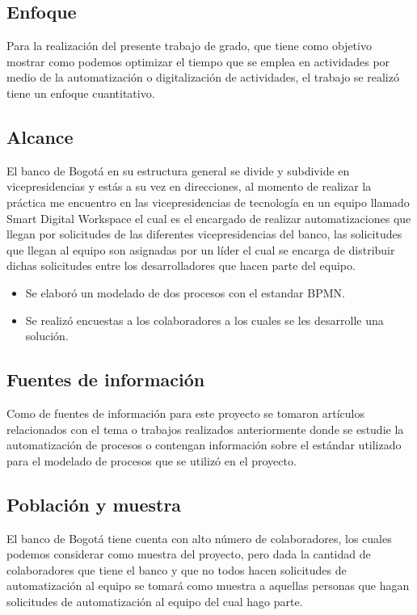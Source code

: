 \subsection[Enfoque]{Enfoque}
Para la realización del presente trabajo de grado, que tiene como objetivo mostrar como podemos optimizar el tiempo que se emplea en actividades por medio de la automatización  o digitalización de actividades, el trabajo se realizó tiene un enfoque cuantitativo.

\subsection[Alcance]{Alcance}
El banco de Bogotá en su estructura general se divide y subdivide en vicepresidencias y estás a su vez en direcciones, al momento de realizar la práctica me encuentro en las vicepresidencias de tecnología en un equipo llamado Smart Digital Workspace el cual es el encargado de realizar automatizaciones que llegan por solicitudes de las diferentes vicepresidencias del banco, las solicitudes que llegan al equipo son asignadas por un líder el cual se encarga de distribuir dichas solicitudes entre los desarrolladores que hacen parte del equipo.

\begin{itemize}
	\item Se elaboró un modelado de dos procesos con el estandar BPMN.
	\item Se realizó encuestas a los colaboradores a los cuales se les desarrolle una solución.
\end{itemize}


\subsection{Fuentes de información}
Como de fuentes de información para este proyecto se tomaron artículos relacionados con el tema o trabajos realizados anteriormente donde se estudie la automatización de procesos o contengan información sobre el estándar utilizado para el modelado de procesos que se utilizó en el proyecto.

\subsection[Población y muestra]{Población y muestra}

El banco de Bogotá tiene cuenta con alto número de colaboradores, los cuales podemos considerar como muestra del proyecto, pero dada la cantidad de colaboradores que tiene el banco y que no todos hacen solicitudes de automatización al equipo se tomará como muestra a aquellas personas que hagan solicitudes de automatización al equipo del cual hago parte.

